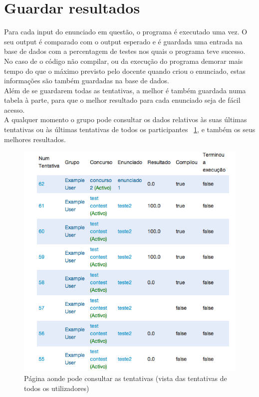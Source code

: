 \section{Guardar resultados}\label{sec res}
Para cada input do enunciado em questão, o programa é executado uma vez. O seu output é comparado com o output esperado e 
é guardada uma entrada na base de dados com a percentagem de testes nos quais o programa teve sucesso.\\
No caso de o código não compilar, ou da execução do programa demorar mais tempo do que o máximo previsto pelo docente quando 
criou o enunciado, estas informações são também guardadas na base de dados.\\
Além de se guardarem todas as tentativas, a melhor é também guardada numa tabela à parte, para que o melhor resultado para cada
enunciado seja de fácil acesso.\\
A qualquer momento o grupo pode consultar os dados relativos às suas últimas tentativas ou às últimas tentativas de todos os participantes ~\ref{img:tentativas}, e também os seus melhores resultados.\\

\begin{figure}[H]
\begin{center}
\includegraphics[scale=0.60]{Images/tentativas}
\caption{Página aonde pode consultar as tentativas (vista das tentativas de todos os utilizadores)}\label{img:tentativas}
\end{center}
\end{figure} 